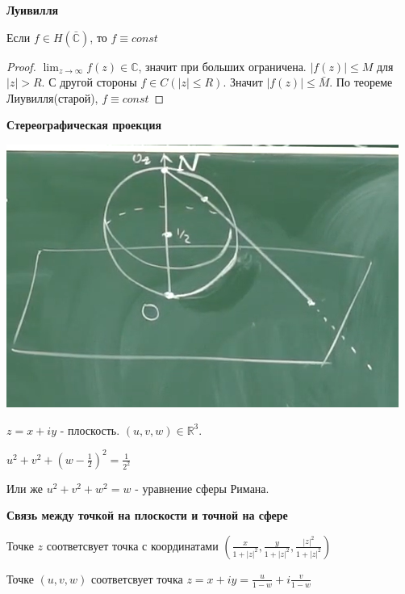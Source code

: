 \begin{theorem}
    \textbf{Луивилля}

    Если $f \in H(\bar{\mathbb{C}})$, то $f \equiv const$
\end{theorem}

\begin{proof}
    $\lim_{z \to \infty} f(z) \in \mathbb{C}$, значит при больших ограничена. $|f(z)| \leqslant M$ для $|z| > R$.
    С другой стороны $f \in C(|z| \leqslant R)$. Значит $|f(z)| \leqslant \bar{M}$.
    По теореме Лиувилля(старой), $f \equiv const$
\end{proof}

\newpage

\begin{definition}
    \textbf{Стереографическая проекция}
    \begin{center}
        \includegraphics{assets/04-functions-of-complex-variables/stereo-graphical-projection.png}
    \end{center}

    $z = x + iy$ - плоскость. $(u, v, w) \in \mathbb{R}^3$.

    $u^2 + v^2 + (w - \frac{1}{2})^2 = \frac{1}{2^2}$

    Или же $u^2 + v^2 + w^2 = w$ - уравнение сферы Римана.
\end{definition}

\begin{theorem}
    \textbf{Связь между точкой на плоскости и точной на сфере}

    Точке $z$ соответсвует точка с координатами $(\frac{x}{1 + |z|^2}, \frac{y}{1 + |z|^2}, \frac{|z|^2}{1 + |z|^2})$

    \begin{remark}
        Точке $(u, v, w)$ соответсвует точка $z = x + iy = \frac{u}{1 - w} + i \frac{v}{1 - w}$
    \end{remark}
\end{theorem}

